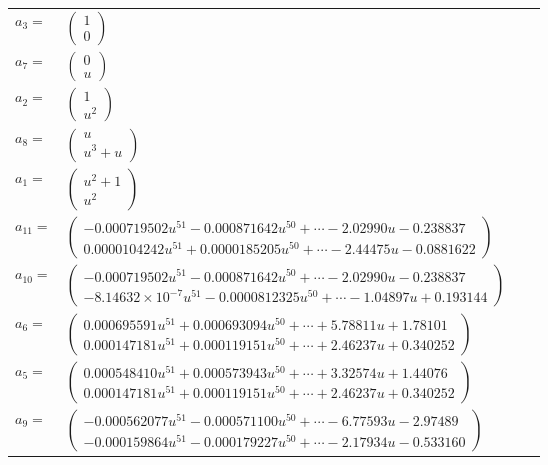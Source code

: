 \documentclass[1p]{elsarticle_modified}
\theoremstyle{definition}
\begin{document}
\begin{tabular}{m{7pt} m{180pt} m{7pt} m{180pt} }
\flushright $a_{3}=$&$\begin{pmatrix}1\\0\end{pmatrix}$ \\
\flushright $a_{7}=$&$\begin{pmatrix}0\\u\end{pmatrix}$ \\
\flushright $a_{2}=$&$\begin{pmatrix}1\\u^2\end{pmatrix}$ \\
\flushright $a_{8}=$&$\begin{pmatrix}u\\u^3+u\end{pmatrix}$ \\
\flushright $a_{1}=$&$\begin{pmatrix}u^2+1\\u^2\end{pmatrix}$ \\
\flushright $a_{11}=$&$\begin{pmatrix}-0.000719502 u^{51}-0.000871642 u^{50}+\cdots-2.02990 u-0.238837\\0.0000104242 u^{51}+0.0000185205 u^{50}+\cdots-2.44475 u-0.0881622\end{pmatrix}$ \\
\flushright $a_{10}=$&$\begin{pmatrix}-0.000719502 u^{51}-0.000871642 u^{50}+\cdots-2.02990 u-0.238837\\-8.14632\times10^{-7} u^{51}-0.0000812325 u^{50}+\cdots-1.04897 u+0.193144\end{pmatrix}$ \\
\flushright $a_{6}=$&$\begin{pmatrix}0.000695591 u^{51}+0.000693094 u^{50}+\cdots+5.78811 u+1.78101\\0.000147181 u^{51}+0.000119151 u^{50}+\cdots+2.46237 u+0.340252\end{pmatrix}$ \\
\flushright $a_{5}=$&$\begin{pmatrix}0.000548410 u^{51}+0.000573943 u^{50}+\cdots+3.32574 u+1.44076\\0.000147181 u^{51}+0.000119151 u^{50}+\cdots+2.46237 u+0.340252\end{pmatrix}$ \\
\flushright $a_{9}=$&$\begin{pmatrix}-0.000562077 u^{51}-0.000571100 u^{50}+\cdots-6.77593 u-2.97489\\-0.000159864 u^{51}-0.000179227 u^{50}+\cdots-2.17934 u-0.533160\end{pmatrix}$ \\

\end{tabular}
\end{document}
